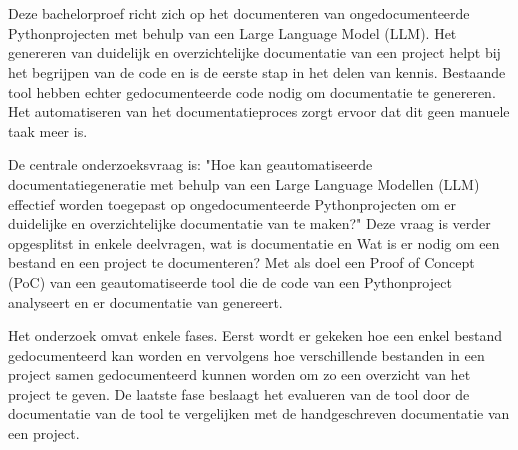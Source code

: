 
%
%
%
%
%


\chapter*{}

Deze bachelorproef richt zich op het documenteren van ongedocumenteerde Pythonprojecten met behulp van een Large Language Model (LLM).
Het genereren van duidelijk en overzichtelijke documentatie van een project helpt bij het begrijpen van de code en is de eerste stap in het delen van kennis.
Bestaande tool hebben echter gedocumenteerde code nodig om documentatie te genereren. 
Het automatiseren van het documentatieproces zorgt ervoor dat dit geen manuele taak meer is.  

De centrale onderzoeksvraag is: "Hoe kan geautomatiseerde documentatiegeneratie met behulp van een Large Language Modellen (LLM) effectief worden toegepast op ongedocumenteerde Pythonprojecten om er duidelijke en overzichtelijke documentatie van te maken?" 
Deze vraag is verder opgesplitst in enkele deelvragen, wat is documentatie en Wat is er nodig om een bestand en een project te documenteren?
Met als doel een Proof of Concept (PoC) van een geautomatiseerde tool die de code van een Pythonproject analyseert en er documentatie van genereert.

Het onderzoek omvat enkele fases. Eerst wordt er gekeken hoe een enkel bestand gedocumenteerd kan worden en vervolgens hoe verschillende bestanden in een project samen gedocumenteerd kunnen worden om zo een overzicht van het project te geven.
De laatste fase beslaagt het evalueren van de tool door de documentatie van de tool te vergelijken met de handgeschreven documentatie van een project.

